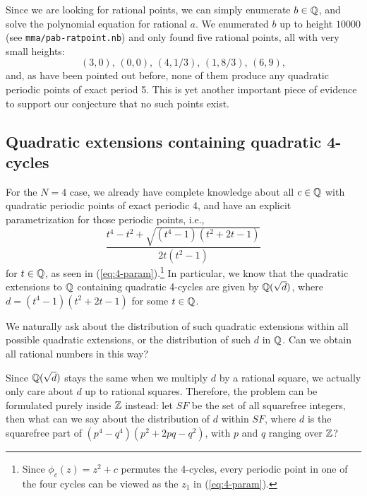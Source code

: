 Since we are looking for rational points, we can simply enumerate $b
\in \mathbb{Q}$, and solve the polynomial equation for rational $a$. We
enumerated $b$ up to height $10000$ (see \texttt{mma/pab-ratpoint.nb})
and only found five rational points, all with very small heights:
\[
(3, 0),\, (0, 0),\, (4, 1/3),\, (1, 8/3),\, (6, 9),
\]
and, as have been pointed out before, none of them produce any
quadratic periodic points of exact period 5. This is yet another
important piece of evidence to support our conjecture that no such
points exist.

\subsection{Quadratic extensions containing quadratic 4-cycles}
\label{subsec:d-distribution}

For the $N = 4$ case, we already have complete knowledge about all $c
\in \mathbb{Q}$ with quadratic periodic points of exact periodic 4, and have
an explicit parametrization for those periodic points, i.e.,
\[
\frac{t^4 - t^2 + \sqrt{(t^4 - 1)(t^2 + 2t - 1)}}{2t(t^2 - 1)}
\]
for $t \in \mathbb{Q}$, as seen in (\ref{eq:4-param}).\footnote{%
  Since $\phi_c(z) = z^2 + c$ permutes the 4-cycles, every periodic
  point in one of the four cycles can be viewed as the $z_1$ in
  (\ref{eq:4-param}).}
In particular, we know that the quadratic extensions to $\mathbb{Q}$
containing quadratic 4-cycles are given by $\mathbb{Q}(\sqrt{d})$, where $d =
(t^4 - 1)(t^2 + 2t - 1)$ for some $t \in \mathbb{Q}$.

We naturally ask about the distribution of such quadratic extensions
within all possible quadratic extensions, or the distribution of such
$d$ in $\mathbb{Q}$. Can we obtain all rational numbers in this way?

Since $\mathbb{Q}(\sqrt{d})$ stays the same when we multiply $d$ by a rational
square, we actually only care about $d$ up to rational
squares. Therefore, the problem can be formulated purely inside $\mathbb{Z}$
instead: let $SF$ be the set of all squarefree integers, then what can
we say about the distribution of $d$ within $SF$, where $d$ is the
squarefree part of $(p^4 - q^4)(p^2 + 2pq - q^2)$, with $p$ and $q$
ranging over $\mathbb{Z}$?

